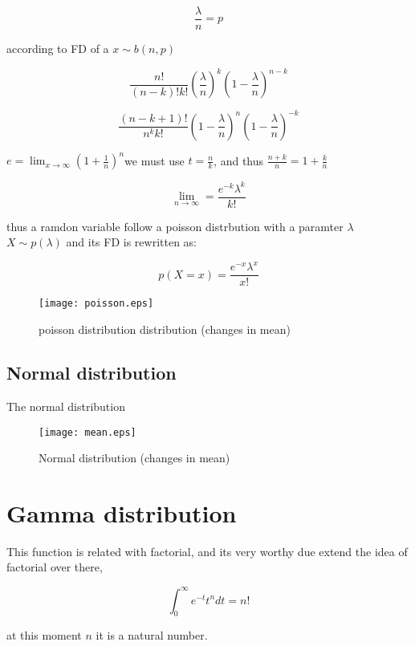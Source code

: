 \documentclass[10pt,a4paper]{article}
\begin{document}
$$\frac{\lambda}{n}=p$$

according to FD of a $x \sim b(n,p)$

$$ \frac{n!}{(n-k)!k!}(\frac{\lambda}{n})^{k} (1-\frac{\lambda}{n})^{n-k}$$


$$\frac{(n-k+1)!}{n^{k}k!} ( 1 - \frac{\lambda}{n})^{n}  ( 1 -\frac{\lambda}{n})^{-k} $$



$e=\lim_{x \to \infty} (1+\frac{1}{n})^n$we must use $t=\frac{n}{k}$,  and thus $ \frac{n+k}{n} = 1+\frac{k}{n}$

$$ \lim_{n \to \infty} = \frac{e^{-k} \lambda^{k} }{k!} $$

thus a ramdon variable follow a poisson distrbution with a paramter $\lambda$ $X \sim p(\lambda)$ and its FD is rewritten as:

$$p(X=x)=\frac{e^{-x}\lambda^{x}}{x!}$$


\begin{figure}[ht]
\begin{center}

\texttt{[image: poisson.eps]}
\caption{poisson distribution distribution (changes in mean)}
\end{center}
\end{figure}



\subsection{Normal distribution}
The normal distribution 




\begin{figure}[ht]
\begin{center}

\texttt{[image: mean.eps]}
\caption{Normal distribution (changes in mean)}
\end{center}
\end{figure}





\section{Gamma distribution}
This function is related with factorial, and its very worthy due extend the 
idea of factorial over there,

$$ \int_{0}^{\infty} e^{-t}t^{n} dt = n! $$

at this moment $n$ it is a natural number.
\end{document}
